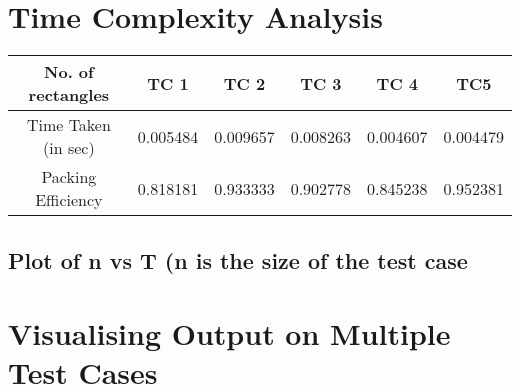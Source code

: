 \documentclass[12pt, a4paper,openany]{article}
\begin{document}
\newpage %

\section{Time Complexity Analysis}
\begin{center}
\begin{tabular}{|c|c|c|c|c|c|}
    \hline
    \rowcolor[HTML]{DAE8FC} 
    No. of rectangles & TC 1  & TC 2  &TC 3 &TC 4 &TC5 \\ \hline
    \rowcolor[HTML]{FFFC9E} 
    {Time Taken (in sec)} & {0.005484}  & {\color[HTML]{000000} 0.009657}  & {\color[HTML]{000000} 0.008263} & {\color[HTML]{000000} 0.004607}  & {\color[HTML]{000000} 0.004479}  \\ \hline
    \rowcolor[HTML]{FFFC9E} 
    {\color[HTML]{000000} Packing Efficiency}                         & {\color[HTML]{000000} 0.818181}  & {\color[HTML]{000000} 0.933333} & {\color[HTML]{000000} 0.902778}      & {\color[HTML]{000000} 0.845238}  & {\color[HTML]{000000} 0.952381}                \\ \hline
    
\end{tabular}
\end{center}
\subsection{Plot of n vs T (n is the size of the test case}

\newpage %

\section{Visualising Output on Multiple Test Cases}
\end{document}
